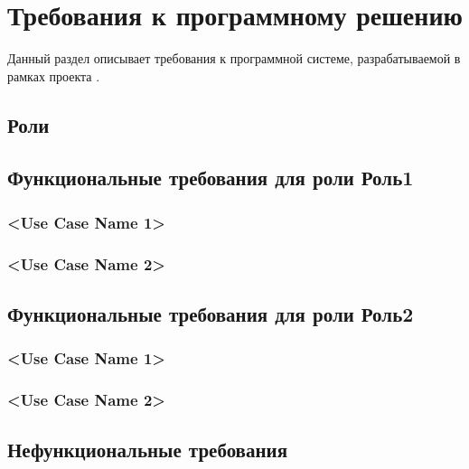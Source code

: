 \chapter{Требования к программному решению}
	\label{chapter3}

	Данный раздел описывает требования к программной системе, разрабатываемой в рамках проекта \ProjectName.
		
	\section{Роли}

	\section{Функциональные требования для роли Роль1}
		\subsection{<Use Case Name 1>}

		\subsection{<Use Case Name 2>}
	\section{Функциональные требования для роли Роль2}
		\subsection{<Use Case Name 1>}

		\subsection{<Use Case Name 2>}

	\section{Нефункциональные требования}
